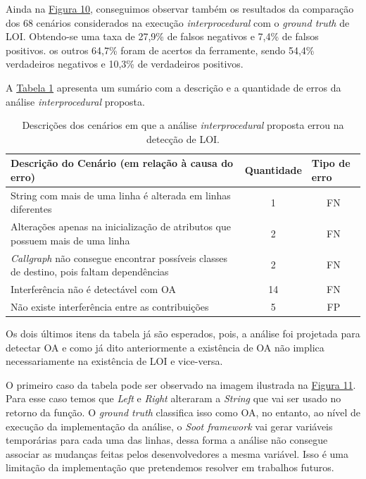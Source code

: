 Ainda na \hyperref[fig:loi-x-groundtruthloi]{Figura 10}, conseguimos observar também os resultados da comparação dos 68 cenários considerados na execução \emph{interprocedural} com o \emph{ground truth} de LOI. Obtendo-se uma taxa de 27,9\% de falsos negativos e 7,4\% de falsos positivos. os outros 64,7\% foram de acertos da ferramente, sendo 54,4\% verdadeiros negativos e 10,3\% de verdadeiros positivos.

A \hyperref[tab:erros-inter-loi]{Tabela 1} apresenta um sumário com a descrição e a quantidade de erros da análise \emph{interprocedural} proposta.

\begin{table}[h]
    \centering
    \begin{tabularx}{\linewidth}{X c c}
        \hline
        Descrição do Cenário (em relação à causa do erro) & \multicolumn{1}{l}{Quantidade} & \multicolumn{1}{l}{Tipo de erro} \\ \hline
        String com mais de uma linha é alterada em linhas diferentes & 1 & FN \\ \hline
        Alterações apenas na inicialização de atributos que possuem mais de uma linha & 2 & FN \\ \hline
        \emph{Callgraph} não consegue encontrar possíveis classes de destino, pois faltam dependências & 2  & FN \\ \hline
        Interferência não é detectável com OA & 14 & FN \\ \hline
        Não existe interferência entre as contribuições & 5  & FP\\ \hline
    \end{tabularx}
    \caption{Descrições dos cenários em que a análise \emph{interprocedural} proposta errou na detecção de LOI.}
    \label{tab:erros-inter-loi}
\end{table}

Os dois últimos itens da tabela já são esperados, pois, a análise foi projetada para detectar OA e como já dito anteriormente a existência de OA não implica necessariamente na existência de LOI e vice-versa.

O primeiro caso da tabela pode ser observado na imagem ilustrada na \hyperref[fig:ad2be67]{Figura 11}. Para esse caso temos que \emph{Left} e \emph{Right} alteraram a \emph{String} que vai ser usado no retorno da função. O \emph{ground truth} classifica isso como OA, no entanto, ao nível de execução da implementação da análise, o \emph{Soot framework} vai gerar variáveis temporárias para cada uma das linhas, dessa forma a análise não consegue associar as mudanças feitas pelos desenvolvedores a mesma variável. Isso é uma limitação da implementação que pretendemos resolver em trabalhos futuros.

